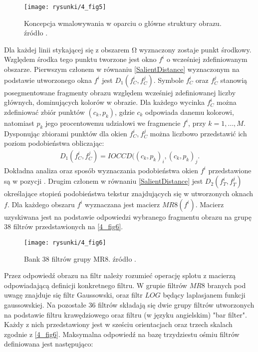 \documentclass[12pt, twoside, openany]{report}
\theoremstyle{definition}
\begin{document}
\begin{figure}[!h]
	\centering
	\texttt{[image: rysunki/4\_fig5]}
	\caption{Koncepcja wmalowywania w oparciu o główne struktury obrazu. źródło \cite{StructurePropagationManual}.}
	\label{4_fig5} 
\end{figure}
Dla każdej linii stykającej się z obszarem $\mathrm{\Omega }$ wyznaczony zostaje punkt środkowy. Względem środka tego punktu tworzone jest okno  $f^i$ o wcześniej zdefiniowanym obszarze. Pierwszym członem w równaniu \eqref{SalientDistance} wyznaczonym na podstawie utworzonego okna $f^i$ jest $D_1\left(f^i_C,f^j_C\right)$. Symbole $f^i_C$ oraz $f^j_C$ stanowią posegmentowane fragmenty obrazu względem wcześniej zdefiniowanej liczby głównych, dominujących kolorów w obrazie. Dla każdego wycinka $f^i_C$ można zdefiniować zbiór punktów $(c_k,p_k)$, gdzie $c_k$ odpowiada danemu kolorowi, natomiast $p_k$ jego procentowemu udziałowi we fragmencie $f^i$, przy $k=1,\dots ,M$. Dysponując zbiorami punktów dla okien $f^i_C$,$\ f^j_C$ można liczbowo przedstawić ich poziom podobieństwa obliczając: 
\begin{align}
D_1\left(f^i_C,f^j_C\right)=IOCCD({\left(c_k,p_k\right)}_i,{\left(c_k,p_k\right)}_j.
\label{colDistance}
\end{align}
Dokładna analiza oraz sposób wyznaczania podobieństwa okien $f^i$ przedstawione są w pozycji \cite{chen2005adaptive}.
Drugim członem w równaniu \eqref{SalientDistance} jest $D_2\left(f^i_T,f^j_T\right)$ określające stopień podobieństwa tekstur znajdujących się w utworzonych oknach $f$. Dla każdego obszaru $f^i$ wyznaczana jest macierz $MR8(f^i)$. Macierz uzyskiwana jest na podstawie odpowiedzi wybranego fragmentu obrazu na grupę 38 filtrów przedstawionych na \autoref{4_fig6}.
\begin{figure}[!h]
	\centering
	\texttt{[image: rysunki/4\_fig6]}
	\caption{Bank 38 filtrów grupy MR8. źródło \cite{varma2009statistical}.}
\label{4_fig6}
\end{figure}
Przez odpowiedź obrazu na filtr należy rozumieć operację splotu z macierzą odpowiadającą definicji konkretnego filtru. W grupie filtrów $MR8$ branych pod uwagę znajduje się filtr Gaussowski, oraz filtr $LOG$ będący laplasjanem funkcji gaussowskiej.
Na pozostałe 36 filtrów składają się dwie grupy filtrów utworzonych na podstawie filtru krawędziowego oraz filtru (w języku angielskim) "bar filter". Każdy z nich przedstawiony jest w sześciu orientacjach oraz trzech skalach zgodnie z \autoref{4_fig6}. Maksymalna odpowiedź na bazę trzydziestu ośmiu filtrów definiowana jest następująco:
\end{document}

